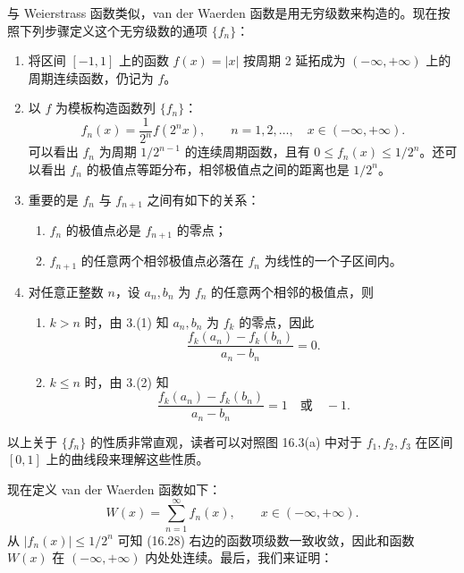 与 Weierstrass 函数类似，van der Waerden 函数是用无穷级数来构造的。现在按照下列步骤定义这个无穷级数的通项 $\{f_n\}$：
\begin{enumerate}[label=\arabic*.]
\item 将区间 $[-1,1]$ 上的函数 $f(x)=|x|$ 按周期 2 延拓成为 $(-\infty,+\infty)$ 上的周期连续函数，仍记为 $f$。
\item 以 $f$ 为模板构造函数列 $\{f_n\}$：
\begin{equation}
  f_n(x)=\frac1{2^n}f(2^nx),\qquad n=1,2,\ldots,\quad x\in(-\infty,+\infty).
\tag{16.25}
\label{eq:16.25}
\end{equation}
可以看出 $f_n$ 为周期 $1/2^{n-1}$ 的连续周期函数，且有 $0\leqslant f_n(x)\leqslant1/2^n$。还可以看出 $f_n$ 的极值点等距分布，相邻极值点之间的距离也是 $1/2^n$。
\item 重要的是 $f_n$ 与 $f_{n+1}$ 之间有如下的关系：
\begin{enumerate}[label=(\arabic*)]
\item $f_n$ 的极值点必是 $f_{n+1}$ 的零点；
\item $f_{n+1}$ 的任意两个相邻极值点必落在 $f_n$ 为线性的一个子区间内。
\end{enumerate}
\item 对任意正整数 $n$，设 $a_n,b_n$ 为 $f_n$ 的任意两个相邻的极值点，则
\begin{enumerate}[label=(\arabic*)]
\item $k>n$ 时，由 3.(1) 知 $a_n,b_n$ 为 $f_k$ 的零点，因此
\begin{equation}
  \frac{f_k(a_n)-f_k(b_n)}{a_n-b_n}=0.
\tag{16.26}
\label{eq:16.26}
\end{equation}
\item $k\leqslant n$ 时，由 3.(2) 知
\begin{equation}
  \frac{f_k(a_n)-f_k(b_n)}{a_n-b_n}=1\quad\text{或}\quad-1.
\tag{16.27}
\label{eq:16.27}
\end{equation}
\end{enumerate}
\end{enumerate}

以上关于 $\{f_n\}$ 的性质非常直观，读者可以对照图 16.3(a) 中对于 $f_1,f_2,f_3$ 在区间 $[0,1]$ 上的曲线段来理解这些性质。

现在定义 van der Waerden 函数如下：
\begin{equation}
  W(x)=\sum_{n=1}^{\infty}f_n(x),\qquad x\in(-\infty,+\infty).
\tag{16.28}
\label{eq:16.28}
\end{equation}
从 $|f_n(x)|\leqslant1/2^n$ 可知 (16.28) 右边的函数项级数一致收敛，因此和函数 $W(x)$ 在 $(-\infty,+\infty)$ 内处处连续。最后，我们来证明：

